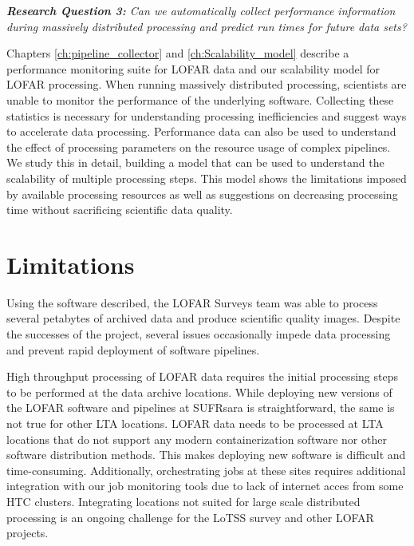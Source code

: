 \begin{addmargin}[4em]{8em}%
    \emph{\textbf{Research Question 3:} Can we automatically collect performance information during massively distributed processing and predict run times for future data sets?}
\end{addmargin}

Chapters \ref{ch:pipeline_collector} and \ref{ch:Scalability_model} describe a performance monitoring suite for LOFAR data and our scalability model for LOFAR processing. When running massively distributed processing, scientists are unable to monitor the performance of the underlying software. Collecting these statistics is necessary for understanding processing inefficiencies and suggest ways to accelerate data processing. Performance data can also be used to understand the effect of processing parameters on the resource usage of complex pipelines. We study this in detail, building a model that can be used to understand the scalability of multiple processing steps. This model shows the limitations imposed by available processing resources as well as suggestions on decreasing processing time without sacrificing scientific data quality. 

\section{Limitations}

Using the software described, the LOFAR Surveys team was able to process several petabytes of archived data and produce scientific quality images. Despite the successes of the project, several issues occasionally impede data processing and prevent rapid deployment of software pipelines.

High throughput processing of LOFAR data requires the initial processing steps to be performed at the data archive locations. While deploying new versions of the LOFAR software and pipelines at SUFRsara is straightforward, the same is not true for other LTA locations. LOFAR data needs to be processed at LTA locations that do not support any modern containerization software nor other software distribution methods. This makes deploying new software is difficult and time-consuming. Additionally, orchestrating jobs at these sites requires additional integration with our job monitoring tools due to lack of internet acces from some HTC clusters. Integrating locations not suited for large scale distributed processing is an ongoing challenge for the LoTSS survey and other LOFAR projects.

